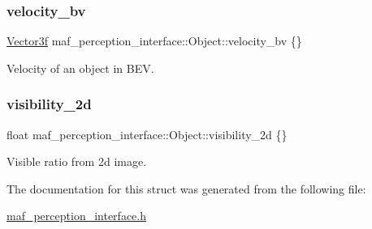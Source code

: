 \subsubsection{\texorpdfstring{velocity\+\_\+bv}{velocity\_bv}}
{\footnotesize\ttfamily \hyperlink{structmaf__perception__interface_1_1Vector3f}{Vector3f} maf\+\_\+perception\+\_\+interface\+::\+Object\+::velocity\+\_\+bv \{\}}



Velocity of an object in B\+EV. 

\mbox{\label{structmaf__perception__interface_1_1Object_a18a3205b770225fdd5d7ec3660176397}} 
\subsubsection{\texorpdfstring{visibility\+\_\+2d}{visibility\_2d}}
{\footnotesize\ttfamily float maf\+\_\+perception\+\_\+interface\+::\+Object\+::visibility\+\_\+2d \{\}}



Visible ratio from 2d image. 



The documentation for this struct was generated from the following file\+:\begin{DoxyCompactItemize}
\item 
\hyperlink{maf__perception__interface_8h}{maf\+\_\+perception\+\_\+interface.\+h}\end{DoxyCompactItemize}
